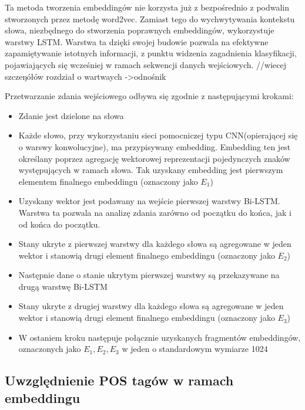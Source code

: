 Ta metoda tworzenia embeddingów nie korzysta już z bezpośrednio z podwalin stworzonych przez metodę word2vec. Zamiast tego do wychwytywania kontekstu słowa, niezbędnego do stworzenia poprawnych embeddingów, wykorzystuje warstwy LSTM. Warstwa ta dzięki swojej budowie pozwala na efektywne zapamiętywanie istotnych informacji, z punktu widzenia zagadnienia klasyfikacji, pojawiających się wcześniej w ramach sekwencji danych wejściowych. 
//wiecej szczeŋółów rozdział o wartwaych  ->odnośnik

 

Przetwarzanie zdania wejściowego odbywa się zgodnie z następującymi krokami: 

\begin{itemize}
    \item Zdanie jest dzielone na słowa 
    \item Każde słowo, przy wykorzystaniu sieci pomocniczej typu CNN(opierającej się o warswy konwolucyjne), ma przypisywany embedding. Embedding ten jest określany poprzez agregację wektorowej reprezentacji pojedynczych znaków występujących w ramach słowa. Tak uzyskany embedding jest pierwszym elementem finalnego embeddingu (oznaczony jako $E_1$)
    \item Uzyskany wektor jest podawany na wejście pierwszej warstwy Bi-LSTM. Warstwa ta pozwala na analizę zdania zarówno od początku do końca, jak i od końca do początku. 
    \item  Stany ukryte z pierwszej warstwy dla każdego słowa są agregowane w jeden wektor i stanowią drugi element finalnego embeddingu (oznaczony jako $E_2$) 
    \item Następnie dane o stanie ukrytym pierwszej warstwy są przekazywane na drugą warstwę Bi-LSTM 
    \item Stany ukryte z drugiej warstwy dla każdego słowa są agregowane w jeden wektor i stanowią drugi element finalnego embeddingu (oznaczony jako $E_3$) 
    \item W ostaniem kroku następuje połącznie uzyskanych fragmentów embeddingów, oznaczonych jako $E_1,E_2, E_3$ w jeden o standardowym wymiarze 1024 
\end{itemize}

 



\subsection{Uwzględnienie POS tagów w ramach embeddingu}


